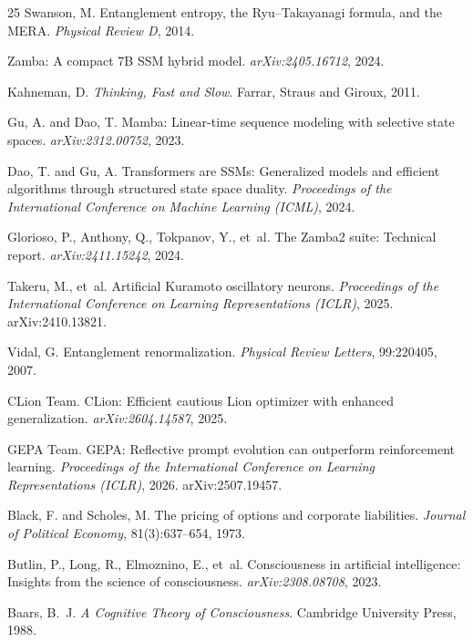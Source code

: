 \documentclass[11pt,a4paper,twocolumn]{article}
\begin{document}
\begin{thebibliography}{25}
Swanson, M.
Entanglement entropy, the Ryu--Takayanagi formula, and the MERA.
\emph{Physical Review D}, 2014.

Zamba: A compact 7B SSM hybrid model.
\emph{arXiv:2405.16712}, 2024.

Kahneman, D.
\emph{Thinking, Fast and Slow}.
Farrar, Straus and Giroux, 2011.

Gu, A. and Dao, T.
Mamba: Linear-time sequence modeling with selective state spaces.
\emph{arXiv:2312.00752}, 2023.

Dao, T. and Gu, A.
Transformers are SSMs: Generalized models and efficient algorithms through structured state space duality.
\emph{Proceedings of the International Conference on Machine Learning (ICML)}, 2024.

Glorioso, P., Anthony, Q., Tokpanov, Y., et~al.
The Zamba2 suite: Technical report.
\emph{arXiv:2411.15242}, 2024.

Takeru, M., et~al.
Artificial Kuramoto oscillatory neurons.
\emph{Proceedings of the International Conference on Learning Representations (ICLR)}, 2025.
arXiv:2410.13821.

Vidal, G.
Entanglement renormalization.
\emph{Physical Review Letters}, 99:220405, 2007.

CLion Team.
CLion: Efficient cautious Lion optimizer with enhanced generalization.
\emph{arXiv:2604.14587}, 2025.

GEPA Team.
GEPA: Reflective prompt evolution can outperform reinforcement learning.
\emph{Proceedings of the International Conference on Learning Representations (ICLR)}, 2026.
arXiv:2507.19457.

Black, F. and Scholes, M.
The pricing of options and corporate liabilities.
\emph{Journal of Political Economy}, 81(3):637--654, 1973.

Butlin, P., Long, R., Elmoznino, E., et~al.
Consciousness in artificial intelligence: Insights from the science of consciousness.
\emph{arXiv:2308.08708}, 2023.

Baars, B.~J.
\emph{A Cognitive Theory of Consciousness}.
Cambridge University Press, 1988.


\end{thebibliography}
\end{document}

